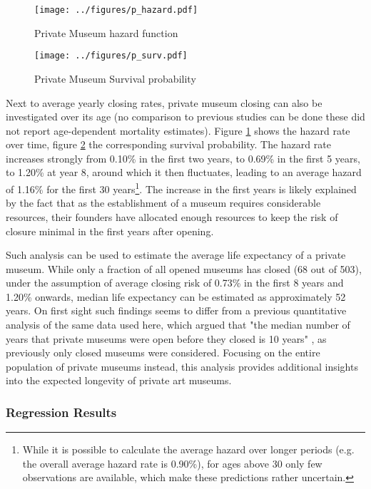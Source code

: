 \documentclass[12pt]{article}
\begin{document}
\begin{figure}[htbp]
\centering
\texttt{[image: ../figures/p\_hazard.pdf]}
\caption{\label{fig:p_hazard}Private Museum hazard function}
\end{figure}

\begin{figure}[htbp]
\centering
\texttt{[image: ../figures/p\_surv.pdf]}
\caption{\label{fig:p_surv}Private Museum Survival probability}
\end{figure}


Next to average yearly closing rates, private museum closing can also be investigated over its age (no comparison to previous studies can be done these did not report age-dependent mortality estimates).
Figure \ref{fig:p_hazard} shows the hazard rate over time, figure \ref{fig:p_surv} the corresponding survival probability.
The hazard rate increases strongly from 0.10\% in the first two years, to 0.69\% in the first 5 years, to 1.20\% at year 8, around which it then fluctuates, leading to an average hazard of 1.16\% for the first 30 years\footnote{While it is possible to calculate the average hazard over longer periods (e.g. the overall average hazard rate is 0.90\%), for ages above 30 only few observations are available, which make these predictions rather uncertain.}.
The increase in the first years is likely explained by the fact that as the establishment of a museum requires considerable resources, their founders have allocated enough resources to keep the risk of closure minimal in the first years after opening.



Such analysis can be used to estimate the average life expectancy of a private museum.
While only a fraction of all opened museums has closed (68 out of 503), under the assumption of average closing risk of 0.73\% in the first 8 years and 1.20\% onwards, median life expectancy can be estimated as approximately 52 years.
On first sight such findings seems to differ from a previous quantitative analysis of the same data used here, which argued that "the median number of years that private museums were open before they closed is 10 years" \parencite[p.5]{Velthuis_Gera_2024_fragility}, as previously only closed museums were considered.
Focusing on the entire population of private museums instead, this analysis provides additional insights into the expected longevity of private art museums.
\subsubsection*{Regression Results}
\end{document}
